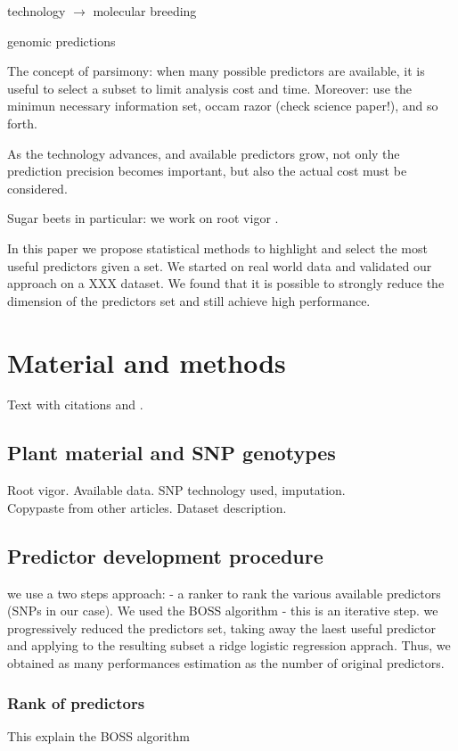 technology $\rightarrow$ molecular breeding \cite{moose2008molecular}

genomic predictions

The concept of parsimony: when many possible predictors are available, it is
useful to select a subset to limit analysis cost and time. Moreover: use
the minimun necessary information set, occam razor (check science paper!), and so forth.

As the technology advances, and available predictors grow, not only the 
prediction precision becomes important, but also the actual cost must
be considered.

Sugar beets in particular: we work on root vigor \cite{biscarini2014genome}.

In this paper we propose statistical methods to highlight and select the 
most useful predictors given a set. We started on real world data and validated
our approach on a XXX dataset. We found that it is possible to strongly reduce
the dimension of the predictors set and still achieve high performance.
\section{Material and methods}
\label{sec:1}
Text with citations \cite{stevanato2013high} and \cite{saccomani2009molecular}.
\subsection{Plant material and SNP genotypes}
\label{sec:data}
Root vigor. Available data. SNP technology used, imputation. \\
Copypaste from other articles. Dataset description.

\subsection{Predictor development procedure}
\label{sec:overview}
we use a two steps approach:
- a ranker to rank the various available predictors (SNPs in our case). We
  used the BOSS algorithm
- this is an iterative step. we progressively reduced the predictors set, 
  taking away the laest useful predictor and applying to the resulting
  subset a ridge logistic regression apprach. Thus, we obtained as many
  performances estimation as the number of original predictors.
\subsubsection{Rank of predictors}
\label{par:boss}
This explain the BOSS algorithm

